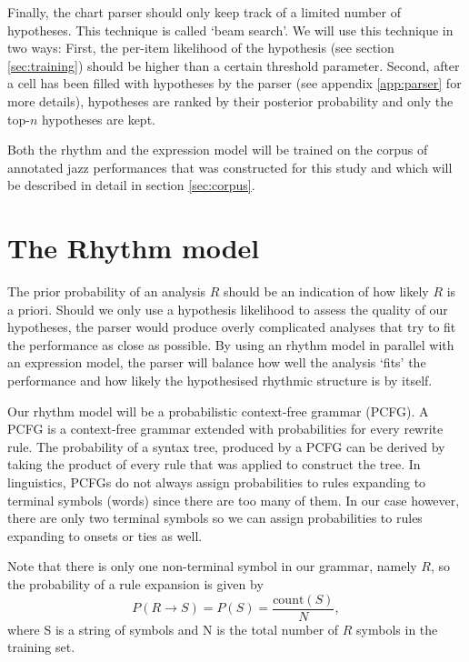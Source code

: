
Finally, the chart parser should only keep track of a limited number of hypotheses. This technique is called `beam search'. We will use this technique in two ways: First, the per-item likelihood of the hypothesis (see section \ref{sec:training}) should be higher than a certain threshold parameter. Second, after a cell has been filled with hypotheses by the parser (see appendix \ref{app:parser} for more details), hypotheses are ranked by their posterior probability and only the top-$n$ hypotheses are kept.

Both the rhythm and the expression model will be trained on the corpus of annotated jazz performances that was constructed for this study and which will be described in detail in section \ref{sec:corpus}.

\section{The Rhythm model}
\label{sec:prior}

The prior probability of an analysis $R$ should be an indication of how likely $R$ is a priori. Should we only use a hypothesis likelihood to assess the quality of our hypotheses, the parser would produce overly complicated analyses that try to fit the performance as close as possible. By using an rhythm model in parallel with an expression model, the parser will balance how well the analysis `fits' the performance and how likely the hypothesised rhythmic structure is by itself.

Our rhythm model will be a probabilistic context-free grammar (PCFG). A PCFG is a context-free grammar extended with probabilities for every rewrite rule. The probability of a syntax tree, produced by a PCFG can be derived by taking the product of every rule that was applied to construct the tree. In linguistics, PCFGs do not always assign probabilities to rules expanding to terminal symbols (words) since there are too many of them. In our case however, there are only two terminal symbols so we can assign probabilities to rules expanding to onsets or ties as well.

Note that there is only one non-terminal symbol in our grammar, namely $R$, so the probability of a rule expansion is given by
\begin{equation}
P(R \rightarrow S) = P(S) = \frac{\mathrm{count}(S)}{N},
\end{equation}
where S is a string of symbols and N is the total number of $R$ symbols in the training set. 

